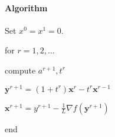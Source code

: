 \paragraph{Algorithm}
Set $x^0 = x^1=0$.

for $r=1,2,\dots$

compute $a^{r+1},t^r$

$\bm y^{r+1} = (1+t^r)\bm x^r - t^r\bm x^{r-1}$

$\bm x^{r+1} = y^{r+1} - \frac{1}{L}\nabla f(\bm y^{r+1})$

end














